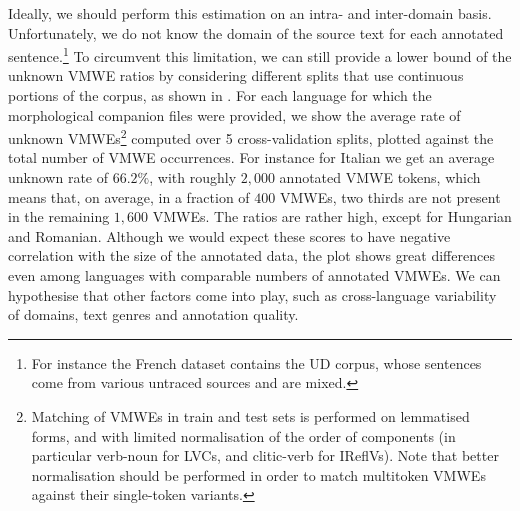 \documentclass[output=paper,
modfonts,
]{langscibook}
\begin{document}
Ideally, we should perform this estimation on an intra- and inter-domain basis. 
Unfortunately, we do not know the domain of the source text for each annotated sentence.\footnote{For instance the French dataset contains the UD corpus, whose sentences come from various untraced sources and are mixed.} To circumvent this limitation, we can still provide a lower bound of the unknown VMWE ratios by considering different splits that use continuous portions of the corpus, as shown in . For each language for which the morphological companion files were provided,
we show the average rate of unknown %
VMWEs\footnote{Matching of VMWEs in train and test sets is performed on lemmatised forms, and with limited normalisation of the order of components (in particular verb-noun for LVCs, and clitic-verb for IReflVs). Note that better normalisation should be performed in order to match multitoken VMWEs against their single-token variants.} computed over 5 cross-validation splits, plotted against the total number of VMWE occurrences. For instance for Italian we get an average unknown rate of $66.2\%$, with roughly $2{,}000$ annotated VMWE tokens, which means that, on average, in a fraction of $400$ VMWEs, two thirds are not present in the remaining $1{,}600$ VMWEs. %
The ratios are rather high, except for Hungarian and Romanian. Although we would expect these scores to have negative correlation with the size of the annotated data, the plot shows great differences even among languages with comparable numbers of annotated VMWEs. We can hypothesise that other factors come into play, such as cross-language variability of domains, text genres and annotation quality.  
\end{document}
